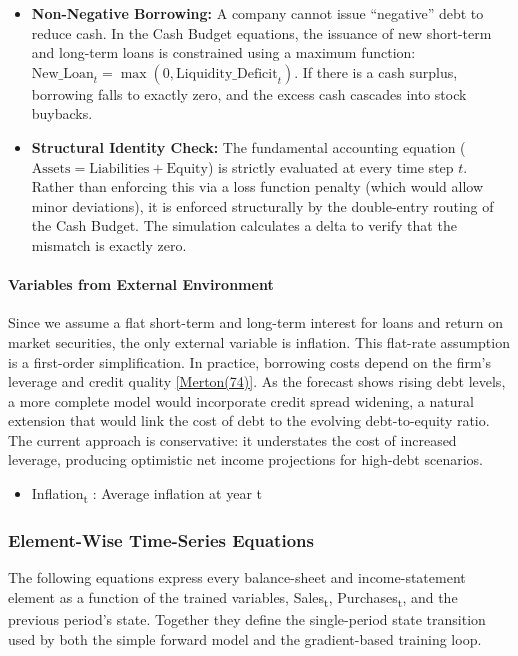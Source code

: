 \documentclass[12pt,a4paper]{article}
\begin{document}
\begin{itemize}
\item
  \textbf{Non-Negative Borrowing:} A company cannot issue ``negative''
  debt to reduce cash. In the Cash Budget equations, the issuance
  of new short-term and long-term loans is constrained using a maximum
  function: $\text{New\_Loan}_t = \max(0,
  \text{Liquidity\_Deficit}_t)$. If there is a cash surplus,
  borrowing falls to exactly zero, and the excess cash cascades into
  stock buybacks.
\item
  \textbf{Structural Identity Check:} The fundamental accounting
  equation ($\text{Assets} = \text{Liabilities} + \text{Equity}$) is
  strictly evaluated at every time step $t$. Rather than enforcing
  this via a loss function penalty (which would allow minor deviations),
  it is enforced structurally by the double-entry routing of the Cash
  Budget. The simulation calculates a delta to verify that the mismatch
  is exactly zero.
\end{itemize}

\paragraph{Variables from External Environment}

Since we assume a flat short-term and long-term interest for loans and
return on market securities, the only external variable is inflation.
This flat-rate assumption is a first-order simplification. In practice, borrowing costs depend on the firm's leverage and credit quality \hyperlink{ref:merton74}{[Merton(74)]}. As the forecast shows rising debt levels, a more complete model would incorporate credit spread widening, a natural extension that would link the cost of debt to the evolving debt-to-equity ratio. The current approach is conservative: it understates the cost of increased leverage, producing optimistic net income projections for high-debt scenarios.

\begin{itemize}
\item
  Inflation\textsubscript{t} : Average inflation at year t
\end{itemize}

\subsubsection{Element-Wise Time-Series Equations}

The following equations express every balance-sheet and income-statement
element as a function of the trained variables,
Sales\textsubscript{t}, Purchases\textsubscript{t}, and the previous
period's state. Together they define the single-period state transition
used by both the simple forward model and the gradient-based training
loop.
\end{document}
